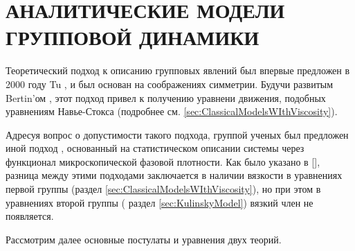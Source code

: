 \chapter{АНАЛИТИЧЕСКИЕ МОДЕЛИ ГРУППОВОЙ ДИНАМИКИ}
\label{ch:TheoreticalModels}

Теоретический подход к описанию групповых явлений был впервые предложен в 2000 году Tu \cite{tu2000}, и был основан на соображениях симметрии. Будучи развитым Bertin'ом \cite{bertin2006}, этот подход привел к получению уравнени движения, подобных уравнениям Навье-Стокса (подробнее см. \ref{sec:ClassicalModelsWIthViscosity}).

Адресуя вопрос о допустимости такого подхода, группой ученых был предложен иной подход \cite{ratushnaya2007,chepizhko2013}, основанный на статистическом описании системы через функционал микроскопической фазовой плотности. Как было указано в [], разница между этими подходами заключается в наличии вязкости в уравнениях первой группы (раздел \ref{sec:ClassicalModelsWIthViscosity}), но при этом в уравнениях второй группы ( раздел \ref{sec:KulinskyModel}) вязкий член не появляется.

Рассмотрим далее основные постулаты и уравнения двух теорий.




